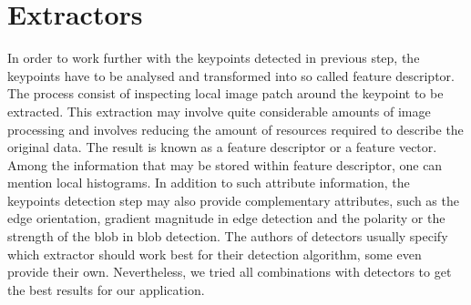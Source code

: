 \section{Extractors}
\label{sec:extractors}
In order to work further with the keypoints detected in previous step, the keypoints have to be analysed and transformed into so called feature descriptor. The process consist of inspecting local image patch around the keypoint to be extracted. This extraction may involve quite considerable amounts of image processing and involves reducing the amount of resources required to describe the original data. The result is known as a feature descriptor or a feature vector. Among the information that may be stored within feature descriptor, one can mention local histograms. In addition to such attribute information, the keypoints detection step may also provide complementary attributes, such as the edge orientation, gradient magnitude in edge detection and the polarity or the strength of the blob in blob detection. The authors of detectors usually specify which extractor should work best for their detection algorithm, some even provide their own. Nevertheless, we tried all combinations with detectors to get the best results for our application.

